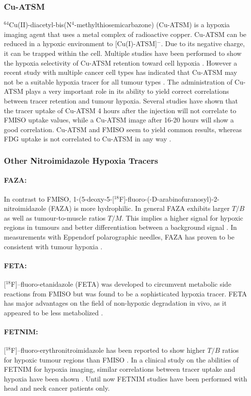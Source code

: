 \subsubsection{Cu-ATSM}
$^{64}$Cu(II)-diacetyl-bis(N$^4$-methylthiosemicarbazone) (Cu-ATSM) is a hypoxia imaging agent that uses a metal complex of radioactive copper. Cu-ATSM can be reduced in a hypoxic environment to [Cu(I)-ATSM]$^-$. Due to its negative charge, it can be trapped within the cell. Multiple studies have been performed to show the hypoxia selectivity of Cu-ATSM retention toward cell hypoxia \cite{pmid9662602}. However a recent study with multiple cancer cell types has indicated that Cu-ATSM may not be a suitable hypoxia tracer for all tumour types \cite{pmid16741309}. The administration of Cu-ATSM plays a very important role in its ability to yield correct correlations between tracer retention and tumour hypoxia. Several studies have shown that the tracer uptake of Cu-ATSM 4 hours after the injection will not correlate to FMISO uptake values, while a Cu-ATSM image after 16-20 hours will show a good correlation. Cu-ATSM and FMISO seem to yield common results, whereas FDG uptake is not correlated to Cu-ATSM in any way \cite{pmid12831991}.
\subsubsection{Other Nitroimidazole Hypoxia Tracers}
\paragraph{FAZA: }In contrast to FMISO, 1-(5-deoxy-5-[$^{18}$F]-fluoro-(-D-arabinofuranosyl)-2- nitroimidazole (FAZA) is more hydrophilic. In general FAZA exhibits larger $T/B$ as well as tumour-to-muscle ratios $T/M$. This implies a higher signal for hypoxic regions in tumours and better differentiation between a background signal \cite{pmid12745023}. In measurements with Eppendorf polarographic needles, FAZA has proven to be consistent with tumour hypoxia \cite{pmid18313528}.
\paragraph{FETA: }[$^{18}$F]--fluoro-etanidazole (FETA) was developed to circumvent metabolic side reactions from FMISO but was found to be a sophisticated hypoxia tracer. FETA has major advantages on the field of non-hypoxic degradation in vivo, as it appeared to be less metabolized \cite{pmid15150578}.
\paragraph{FETNIM: }[$^{18}$F]--fluoro-erythronitroimidazole has been reported to show higher $T/B$ ratios for hypoxic tumour regions than FMISO \cite{pmid7862981}. In a clinical study on the abilities of FETNIM for hypoxia imaging, similar correlations between tracer uptake and hypoxia have been shown \cite{pmid14722675}. Until now FETNIM studies have been performed with head and neck cancer patients only.
